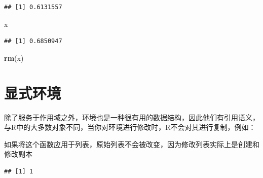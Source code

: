 \documentclass[]{book}
\newenvironment{Shaded}{\begin{snugshade}}{\end{snugshade}}
\newcommand{\KeywordTok}[1]{\textcolor[rgb]{0.13,0.29,0.53}{\textbf{#1}}}
\newcommand{\DecValTok}[1]{\textcolor[rgb]{0.00,0.00,0.81}{#1}}
\newcommand{\StringTok}[1]{\textcolor[rgb]{0.31,0.60,0.02}{#1}}
\newcommand{\ControlFlowTok}[1]{\textcolor[rgb]{0.13,0.29,0.53}{\textbf{#1}}}
\newcommand{\OperatorTok}[1]{\textcolor[rgb]{0.81,0.36,0.00}{\textbf{#1}}}
\newcommand{\NormalTok}[1]{#1}
\begin{document}
\begin{verbatim}
## [1] 0.6131557
\end{verbatim}

\begin{Shaded}
\begin{Highlighting}[]
\NormalTok{x}
\end{Highlighting}
\end{Shaded}

\begin{verbatim}
## [1] 0.6850947
\end{verbatim}

\begin{Shaded}
\begin{Highlighting}[]
\KeywordTok{rm}\NormalTok{(x)}
\end{Highlighting}
\end{Shaded}

\section{显式环境}

除了服务于作用域之外，环境也是一种很有用的数据结构，因此他们有引用语义，与R中的大多数对象不同，当你对环境进行修改时，R不会对其进行复制，例如：

\begin{Shaded}
\end{Shaded}

如果将这个函数应用于列表，原始列表不会被改变，因为修改列表实际上是创建和修改副本

\begin{Shaded}
\end{Shaded}

\begin{verbatim}
## [1] 1
\end{verbatim}
\end{document}
